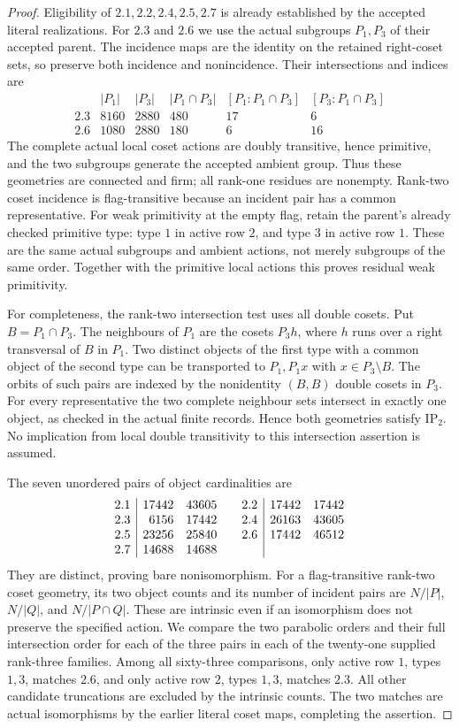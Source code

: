 \documentclass[11pt]{article}
\begin{document}
\begin{proof}
Eligibility of $2.1,2.2,2.4,2.5,2.7$ is already established by the accepted
literal realizations. For $2.3$ and $2.6$ we use the actual subgroups
$P_1,P_3$ of their accepted parent. The incidence maps are the identity
on the retained right-coset sets, so preserve both incidence and
nonincidence. Their intersections and indices are
\[
\begin{array}{c|rrr|rr}
 & |P_1|&|P_3|&|P_1\cap P_3|&[P_1:P_1\cap P_3]&[P_3:P_1\cap P_3]\\\hline
2.3&8160&2880&480&17&6\\
2.6&1080&2880&180&6&16
\end{array}
\]
The complete actual local coset actions are doubly transitive, hence
primitive, and the two subgroups generate the accepted ambient group.
Thus these geometries are connected and firm; all rank-one residues are
nonempty. Rank-two coset incidence is flag-transitive because an incident
pair has a common representative. For weak primitivity at the empty
flag, retain the parent's already checked primitive type: type $1$ in
active row $2$, and type $3$ in active row $1$. These are the same actual
subgroups and ambient actions, not merely subgroups of the same order.
Together with the primitive local actions this proves residual weak
primitivity.

For completeness, the rank-two intersection test uses all double cosets.
Put $B=P_1\cap P_3$. The neighbours of $P_1$ are the cosets $P_3h$,
where $h$ runs over a right transversal of $B$ in $P_1$. Two distinct
objects of the first type with a common object of the second type can
be transported to $P_1,P_1x$ with $x\in P_3\setminus B$. The orbits
of such pairs are indexed by the nonidentity $(B,B)$ double cosets in
$P_3$. For every representative the two complete neighbour sets intersect
in exactly one object, as checked in the actual finite records. Hence
both geometries satisfy $\mathrm{IP}_2$. No implication from local
double transitivity to this intersection assertion is assumed.

The seven unordered pairs of object cardinalities are
\[
\begin{array}{c|rr@{\qquad}c|rr}
2.1&17442&43605&2.2&17442&17442\\
2.3&6156&17442&2.4&26163&43605\\
2.5&23256&25840&2.6&17442&46512\\
2.7&14688&14688&&&
\end{array}
\]
They are distinct, proving bare nonisomorphism. For a flag-transitive
rank-two coset geometry, its two object counts and its number of incident
pairs are $N/|P|$, $N/|Q|$, and $N/|P\cap Q|$. These are intrinsic even
if an isomorphism does not preserve the specified action. We compare
the two parabolic orders and their full intersection order for each of
the three pairs in each of the twenty-one supplied rank-three families.
Among all sixty-three comparisons, only active row $1$, types $1,3$,
matches $2.6$, and only active row $2$, types $1,3$, matches $2.3$.
All other candidate truncations are excluded by the intrinsic counts.
The two matches are actual isomorphisms by the earlier literal coset
maps, completing the assertion.
\end{proof}
\end{document}
